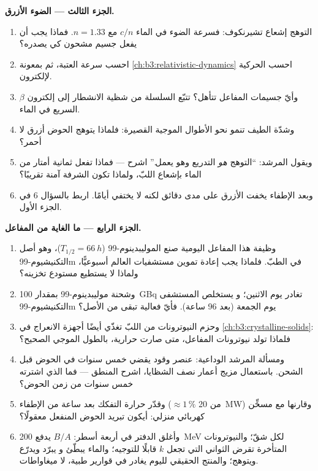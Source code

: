 \begin{problem}
\medskip\noindent\textbf{الجزء الثالث --- الضوء الأزرق.}

\begin{enumerate}[resume]
  \item التوهج إشعاع تشيرنكوف: فسرعة الضوء في الماء
        $c/n$ مع $n = 1.33$. فماذا يجب أن يفعل جسيم مشحون
        كي يصدره؟
  \item احسب سرعة العتبة، ثم بمعونة
        \cref{ch:b3:relativistic-dynamics} احسب 
        الحركية لإلكترون.
  \item وأيّ جسيمات المفاعل تتأهل؟ تتبّع السلسلة من
        شظية الانشطار إلى إلكترون $\beta$ السريع في الماء.
  \item وشدّة الطيف تنمو نحو الأطوال الموجية القصيرة:
        فلماذا يتوهج الحوض أزرق لا أحمر؟
  \item ويقول المرشد: ``التوهج \emph{هو} التدريع
        وهو يعمل.'' اشرح --- فماذا تفعل ثمانية أمتار من الماء
        بإشعاع اللبّ، ولماذا تكون الشرفة آمنة تقريبًا؟
  \item وبعد الإطفاء يخفت الأزرق على مدى دقائق لكنه لا
        يختفي أيامًا. اربط بالسؤال 6 في الجزء الأول.
\end{enumerate}

\medskip\noindent\textbf{الجزء الرابع --- ما الغاية من المفاعل.}

\begin{enumerate}[resume]
  \item وظيفة هذا المفاعل اليومية صنع الموليبدينوم-99
        ($T_{1/2} = \qty{66}{h}$)، وهو أصل
        التكنيشيوم-99m في الطبّ. فلماذا يجب إعادة تموين مستشفيات
        العالم أسبوعيًّا، ولماذا لا يستطيع مستودع تخزينه؟
  \item وشحنة موليبدينوم-99 بمقدار \qty{100}{GBq} تغادر يوم الاثنين؛ و
        يستخلص المستشفى التكنيشيوم-99m يوم الجمعة (بعد 96 ساعة). فأيّ
        فعالية تبقى من الأصل؟
  \item وحزم النيوترونات من اللبّ تغذّي أيضًا أجهزة
        الانعراج في \cref{ch:b3:crystalline-solids}: فلماذا تولد
        نيوترونات المفاعل، متى صارت حرارية، بالطول الموجي الصحيح؟
  \item ومسألة المرشد الوداعية: عنصر وقود يقضي خمس
        سنوات في الحوض قبل الشحن. باستعمال مزيج أعمار
        نصف الشظايا، اشرح المنطق --- فما الذي اشترته خمس
        سنوات من زمن الحوض؟
  \item وقدّر حرارة التفكك بعد ساعة من الإطفاء
        ($\approx1\,\%$ من \qty{20}{MW}) وقارنها مع
        مسخِّن كهربائي منزلي: أيكون تبريد الحوض المنفعل معقولًا؟
  \item وأغلق الدفتر في أربعة أسطر: $B/A$ يدفع
        \qty{200}{MeV} لكل شقّ؛ والنيوترونات المتأخرة تقرض
        الثواني التي تجعل $k$ قابلًا للتوجيه؛ والماء يبطّئ و
        يبرّد ويدرّع ويتوهج؛ والمنتج الحقيقي لليوم
        يغادر في قوارير طبية، لا ميغاواطات.
\end{enumerate}
\end{problem}
